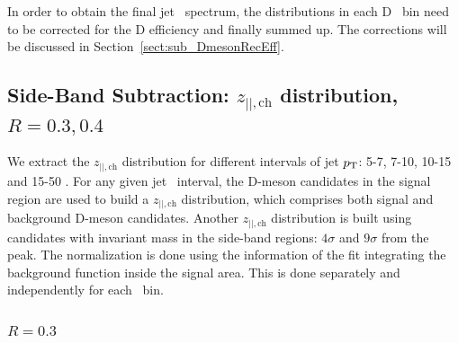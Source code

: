 In order to obtain the final jet \pt\ spectrum, the distributions in each D \pt\ bin need to be corrected for the D efficiency and finally summed up.
The corrections will be discussed in Section~\ref{sect:sub_DmesonRecEff}. 

\subsection{Side-Band Subtraction: $z_{||,\text{ch}}$ distribution, $R=0.3, 0.4$}
\label{sub_Bin_z}
We extract the $z_{||,\text{ch}}$ distribution for different intervals of jet $p_{\text T}$: 5-7, 7-10, 10-15 and 15-50 \GeVc.
For any given jet \pt\ interval, the D-meson candidates in the signal region are used to build a $z_{||,\text{ch}}$ distribution, which comprises both signal and background D-meson candidates.
Another $z_{||,\text{ch}}$ distribution is built using candidates with invariant mass in the side-band regions: $4\sigma$ and $9\sigma$ from the peak.
The normalization is done using the information of the fit integrating the background function inside the signal area. This is done separately and independently for each \ptd\ bin.

\subsubsection{$R=0.3$}

